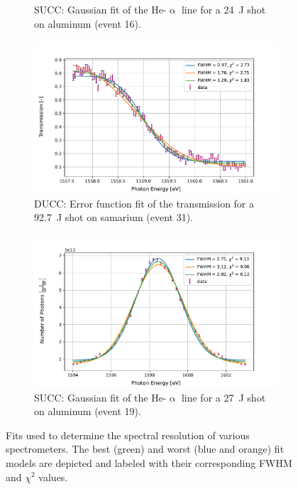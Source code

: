 \begin{figure} [H]
\begin{subfigure}[t]{0.49\textwidth}
		\caption{SUCC: Gaussian fit of the He-$\upalpha$ line for a \SI{24}{\joule} shot on aluminum (event 16).}
		\label{}
	\end{subfigure}
	\begin{subfigure}[t]{0.49\textwidth}
		\centering
		\includegraphics[width=\textwidth]{Data_Analysis/resolution/transmission_of_Sm_event_31_on_DUCC.pdf}
		\caption{DUCC: Error function fit of the transmission for a \SI{92.7}{\joule} shot on samarium (event 31).}
		\label{}
	\end{subfigure}%
	\hfill
	\begin{subfigure}[t]{0.49\textwidth}
		\centering
		\includegraphics[width=\textwidth]{Data_Analysis/resolution/peak_of_Al_event_19_on_SUCC.pdf}
		\caption{SUCC: Gaussian fit of the He-$\upalpha$ line for a \SI{27}{\joule} shot on aluminum (event 19).}
		\label{}
	\end{subfigure}
	\caption{Fits used to determine the spectral resolution of various spectrometers. The best (green) and worst (blue and orange) fit models are depicted and labeled with their corresponding FWHM and $\chi^2$ values.}
	\label{}
\end{figure}

